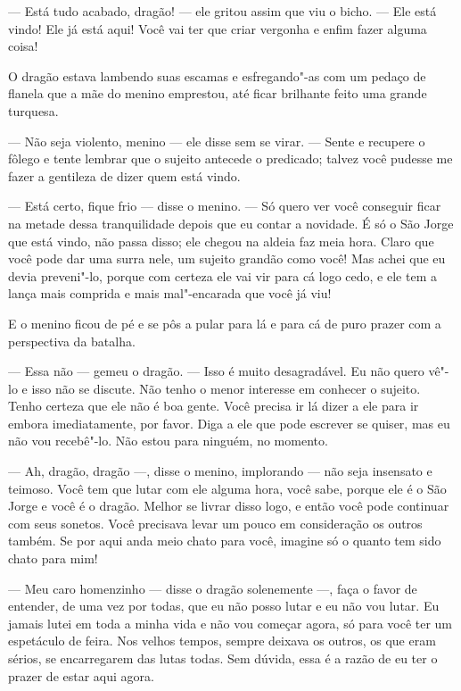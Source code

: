 --- Está tudo acabado, dragão! --- ele gritou assim que viu o bicho. --- Ele
está vindo! Ele já está aqui! Você vai ter que criar vergonha e enfim
fazer alguma coisa!

O dragão estava lambendo suas escamas e esfregando"-as com um pedaço de
flanela que a mãe do menino emprestou, até ficar brilhante feito
uma grande turquesa.

--- Não seja violento, menino --- ele disse sem se virar. --- Sente e
recupere o fôlego e tente lembrar que o sujeito antecede o
predicado; talvez você pudesse me fazer a gentileza de dizer
quem está vindo.

--- Está certo, fique frio --- disse o menino. --- Só quero ver você
conseguir ficar na metade dessa tranquilidade depois que eu contar a
novidade. É só o São Jorge que está vindo, não passa disso; ele
chegou na aldeia faz meia hora. Claro que você pode dar uma surra
nele, um sujeito grandão como você! Mas achei que eu devia
preveni"-lo, porque com certeza ele vai vir para cá logo cedo, e ele
tem a lança mais comprida e mais mal"-encarada que você já viu!

E o menino ficou de pé e se pôs a pular para lá e para cá de puro
prazer com a perspectiva da batalha.

--- Essa não --- gemeu o dragão. --- Isso é muito desagradável. Eu não quero
vê"-lo e isso não se discute. Não tenho o menor interesse em conhecer
o sujeito. Tenho certeza que ele não é boa gente. Você precisa ir lá
dizer a ele para ir embora imediatamente, por favor. Diga a ele que
pode escrever se quiser, mas eu não vou recebê"-lo. Não estou para
ninguém, no momento. 

--- Ah, dragão, dragão ---, disse o menino, implorando --- não seja insensato
e teimoso. Você tem que lutar com ele alguma hora, você sabe, porque
ele é o São Jorge e você é o dragão. Melhor se livrar disso logo, e
então você pode continuar com seus sonetos. Você precisava levar um
pouco em consideração os outros também. Se por aqui anda meio chato
para você, imagine só o quanto tem sido chato para mim!

--- Meu caro homenzinho --- disse o dragão solenemente ---, faça o favor de
entender, de uma vez por todas, que eu não posso lutar e eu não vou
lutar. Eu jamais lutei em toda a minha vida e não vou começar agora,
só para você ter um espetáculo de feira. Nos velhos tempos, sempre
deixava os outros, os que eram sérios, se encarregarem das lutas
todas. Sem dúvida, essa é a razão de eu ter o prazer de estar aqui
agora.


